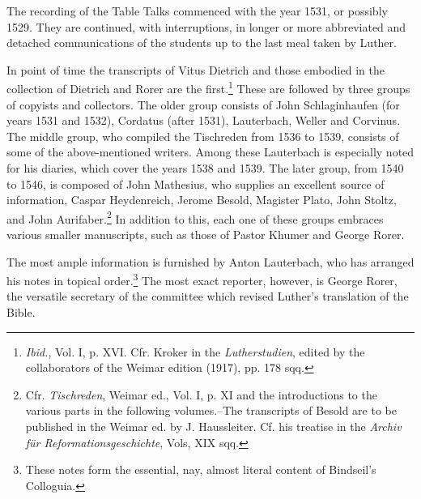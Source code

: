 The recording of the Table Talks commenced with the year 1531,
or possibly 1529. They are continued, with interruptions, in longer or
more abbreviated and detached communications of the students up to
the last meal taken by Luther.

In point of time the transcripts of Vitus Dietrich and those embodied in
the collection of Dietrich and Rorer are the first.\footnote
{\textit{Ibid.}, Vol. I, p. XVI. Cfr. Kroker in the \textit{Lutherstudien}, edited by the collaborators of
the Weimar edition (1917), pp. 178 sqq.}
These are followed by
three groups of copyists and collectors. The older group consists of John
Schlaginhaufen (for years 1531 and 1532), Cordatus (after 1531), Lauterbach,
Weller and Corvinus. The middle group, who compiled the Tischreden
from 1536 to 1539, consists of some of the above-mentioned writers. Among
these Lauterbach is especially noted for his diaries, which cover the years
1538 and 1539. The later group, from 1540 to 1546, is composed of John
Mathesius, who supplies an excellent source of information, Caspar Heydenreich,
Jerome Besold, Magister Plato, John Stoltz, and John Aurifaber.\footnote
{Cfr. \textit{Tischreden}, Weimar ed., Vol. I, p. XI and the introductions to the various parts in
the following volumes.--The transcripts of Besold are to be published in the Weimar ed.
by J. Haussleiter. Cf. his treatise in the \textit{Archiv für Reformationsgeschichte}, Vols, XIX sqq.}
In addition to this, each one of these groups embraces various smaller manuscripts,
such as those of Pastor Khumer and George Rorer.

The most ample information is furnished by Anton Lauterbach, who has
arranged his notes in topical order.\footnote{These notes form the essential, nay, almost literal content of Bindseil’s Colloguia.}
 The most exact reporter, however, is
George Rorer, the versatile secretary of the committee which revised Luther’s
translation of the Bible.

